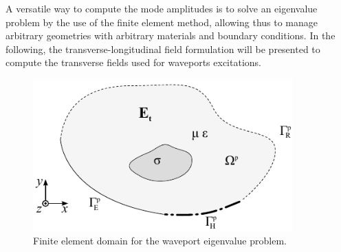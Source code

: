 A versatile way to compute the mode amplitudes is to solve an eigenvalue problem by the use of the finite element method, allowing thus to manage arbitrary geometries with arbitrary materials and boundary conditions. In the following, the transverse-longitudinal field formulation will be presented to compute the transverse fields used for waveports excitations.

\begin{figure}[bpt!]
\centering
\includegraphics[width=10cm]{FEMproblemEigen} 
\caption{Finite element domain for the waveport eigenvalue problem.}
\label{fig:FEMproblemEigen}
\end{figure}


